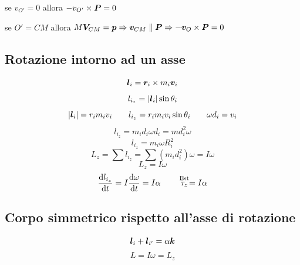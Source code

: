 se $v_{O'}=0$ allora $-v_{O'}\times\boldsymbol{P}=0$

se $O'=CM$ allora $M\boldsymbol{V}_{CM}=\boldsymbol{p}\Rightarrow\boldsymbol{v}_{CM}\parallel\boldsymbol{P}\Rightarrow -\boldsymbol{v}_O\times\boldsymbol{P}=0$

\subsection{Rotazione intorno ad un asse}
\begin{equation*}\boldsymbol{l}_i=\boldsymbol{r}_i\times m_i\boldsymbol{v}_i\end{equation*}
\begin{equation*}l_{i_z}=|\boldsymbol{l}_i|\sin\theta_i\end{equation*}
\[|\boldsymbol{l}_i|=r_im_iv_i\qquad l_{i_z}=r_im_iv_i\sin\theta_i\qquad
\omega d_i=v_i\]
\begin{equation*}l_{i_z}=m_id_i\omega d_i=md_i^2\omega\end{equation*}
\begin{equation*}l_{i_z}=m_i\omega R_i^2\end{equation*}
\begin{equation*}L_z=\sum l_{i_z}=\sum(m_id_i^2)\omega=I\omega\end{equation*}
\begin{equation*}L_z=I\omega\end{equation*}
\[\frac{\mathrm{d} l_{i_z}}{\mathrm{d} t}=I\frac{\mathrm{d} \omega}{\mathrm{d}
t}=I\alpha\qquad \stackrel{\text{Est}}{\tau_{z}}=I\alpha\]
\subsection{Corpo simmetrico rispetto all'asse di rotazione}
\begin{equation*}\boldsymbol{l}_i+\boldsymbol{l}_{i'}=\alpha\boldsymbol{k}\end{equation*}
\begin{equation*}L=I\omega=L_z\end{equation*}


